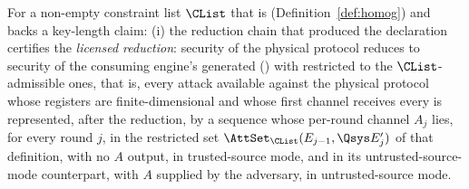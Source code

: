 \begin{assumption}\label{ass:atk}
For a non-empty constraint list $\CList$ that is
 (Definition~\ref{def:homog})
and backs a key-length claim:
(i) the reduction chain that produced the declaration certifies the
\emph{licensed reduction}: security of the physical protocol reduces to
security of the consuming engine's generated 
() with  restricted to the $\CList$-admissible ones, that is, every attack
available against the physical protocol whose registers are finite-dimensional
and whose first channel receives every  is
represented, after the reduction, by a sequence whose per-round channel $A_j$ lies, for every round $j$, in the
restricted set $\AttSet_{\CList}(E_{j-1},\Qsys E'_j)$ of that definition, with
no $A$ output, in trusted-source mode, and in its untrusted-source-mode
counterpart, with $A$ supplied by the adversary, in untrusted-source mode.
\end{assumption}
